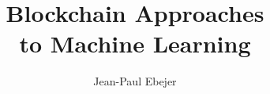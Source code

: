 \documentclass[twoside]{um}  %
\title{Blockchain Approaches\\to Machine Learning}  %
\author{Jean-Paul Ebejer}                           %
\begin{document}
\frontmatter 
    \maketitle
        
    
    
    
    \if@openright\cleardoublepage\else\clearpage\fi
    \tableofcontents*\if@openright\cleardoublepage\else\clearpage\fi
    \listoffigures*\if@openright\cleardoublepage\else\clearpage\fi
    \listoftables*\if@openright\cleardoublepage\else\clearpage\fi
    \if@openright\cleardoublepage\else\clearpage\fi


\mainmatter 
     
    
    
    
    
    
    \appendix
            
                    


\backmatter
    \if@openright\cleardoublepage\else\clearpage\fi
    {\footnotesize}
\end{document}
